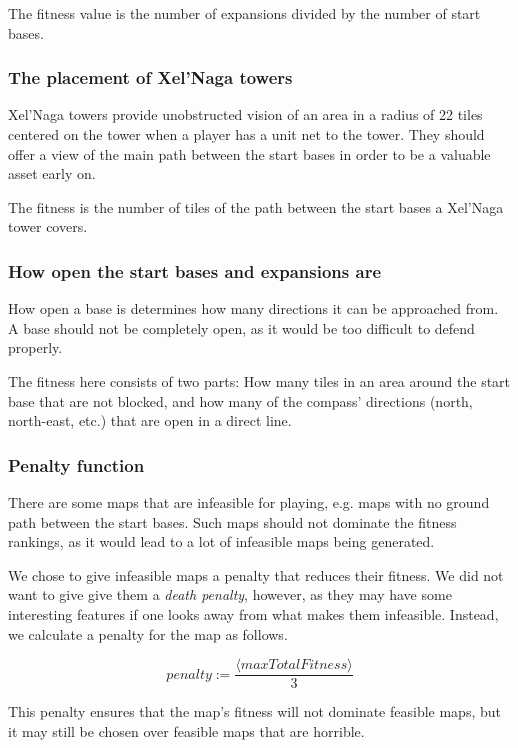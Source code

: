 	The fitness value is the number of expansions divided by the number of start bases.

	\subsubsection*{The placement of Xel'Naga towers}
	Xel'Naga towers provide unobstructed vision of an area in a radius of 22 tiles centered on the tower when a player has a unit net to the tower. They should offer a view of the main path between the start bases in order to be a valuable asset early on. 

	The fitness is the number of tiles of the path between the start bases a Xel'Naga tower covers.

	\subsubsection*{How open the start bases and expansions are}
	How open a base is determines how many directions it can be approached from. A base should not be completely open, as it would be too difficult to defend properly. 

	The fitness here consists of two parts: How many tiles in an area around the start base that are not blocked, and how many of the compass' directions (north, north-east, etc.) that are open in a direct line.

\subsubsection{Penalty function}
\label{MapFitness_Penalty}

There are some maps that are infeasible for playing, e.g. maps with no ground path between the start bases. Such maps should not dominate the fitness rankings, as it would lead to a lot of infeasible maps being generated. 

We chose to give infeasible maps a penalty that reduces their fitness. We did not want to give give them a \textit{death penalty}\cite{coello2012constraint}, however, as they may have some interesting features if one looks away from what makes them infeasible. Instead, we calculate a penalty for the map as follows.

\begin{equation}
	penalty := \frac{\langle maxTotalFitness\rangle}{3}
\end{equation}

This penalty ensures that the map's fitness will not dominate feasible maps, but it may still be chosen over feasible maps that are horrible.